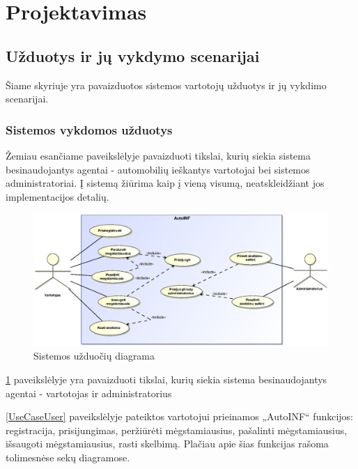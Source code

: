 \documentclass[12pt]{article}
\begin{document}
	\section{Projektavimas}
	\subsection{Užduotys ir jų vykdymo scenarijai}
	Šiame skyriuje yra pavaizduotos sistemos vartotojų užduotys ir jų vykdimo scenarijai.
	\subsubsection{Sistemos vykdomos užduotys}
	Žemiau esančiame paveikslėlyje pavaizduoti tikslai, kurių siekia sistema besinaudojantys agentai - automobilių ieškantys vartotojai bei sistemos administratoriai. Į sistemą žiūrima kaip į vieną visumą, neatskleidžiant jos implementacijos detalių.
	
	\begin{figure}[h]
		\begin{center}
			\includegraphics[width=\textwidth]{Tikslai.eps}
			\caption{Sistemos užduočių diagrama\label{UseCase}}
		\end{center}
	\end{figure}
	
	\ref{UseCase} paveikslėlyje yra pavaizduoti tikslai, kurių siekia sistema besinaudojantys agentai - vartotojas ir administratorius
	\pagebreak

	\ref{UseCaseUser} paveikslėlyje pateiktos vartotojui prieinamos „AutoINF“ funkcijos: registracija, prisijungimas, peržiūrėti mėgstamiausius, pašalinti mėgstamiausius, išsaugoti mėgstamiausius, rasti skelbimą. Plačiau apie šias funkcijas rašoma tolimesnėse sekų diagramose.
	
\end{document}
